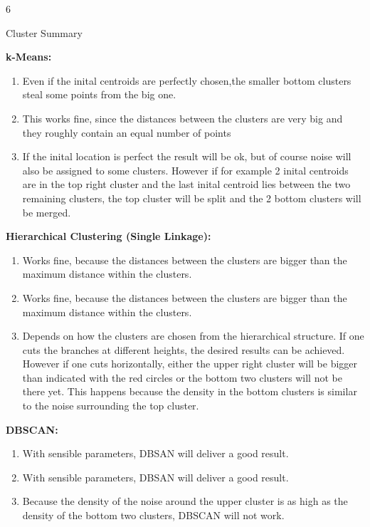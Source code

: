 \documentclass{article}
\begin{document}
    \begin{ukon-infie}[5.12.17]{6}

        \begin{exercise}[p=7]{Cluster Summary}      
       \question{}
       {
       \textbf{k-Means:}
       \begin{enumerate}
       \item Even if the inital centroids are perfectly chosen,the smaller bottom clusters steal some points from the big one.
       \item This works fine, since the distances between the clusters are very big and they roughly contain an equal number of points
       \item If the inital location is perfect the result will be ok, but of course noise will also be assigned to some clusters. However if for example 2 inital centroids are in the top right cluster and the last inital centroid lies between the two remaining clusters, the top cluster will be split and the 2 bottom clusters will be merged.
       \end{enumerate}
       
      	\textbf{Hierarchical Clustering (Single Linkage):}
      	\begin{enumerate}
      	\item Works fine, because the distances between the clusters are bigger than the maximum distance within the clusters.
      	\item Works fine, because the distances between the clusters are bigger than the maximum distance within the clusters.
      	\item Depends on how the clusters are chosen from the hierarchical structure. If one cuts the branches at different heights, the desired results can be achieved. However if one cuts horizontally, either the upper right cluster will be bigger than indicated with the red circles or the bottom two clusters will not be there yet. This happens because the density in the bottom clusters is similar to the noise surrounding the top cluster.
      	\end{enumerate}
      	\textbf{DBSCAN:}
      	\begin{enumerate}
      	\item With sensible parameters, DBSAN will deliver a good result.
      	\item With sensible parameters, DBSAN will deliver a good result.
      	\item Because the density of the noise around the upper cluster is as high as the density of the bottom two clusters, DBSCAN will not work.
      	\end{enumerate}
      	
}
\end{exercise}
\end{ukon-infie}
\end{document}
